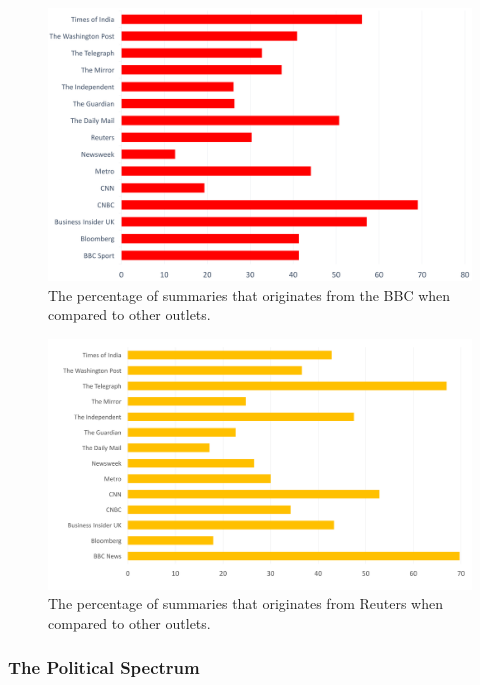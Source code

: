 \documentclass[12pt]{article}
\begin{document}
\begin{figure}[ht!]
  \centering
    \includegraphics[scale=0.15]{bbc-news.png}
   \caption[A graph depicting responses to the User Interface Survey]{The percentage of summaries that originates from the BBC \cite{bbc} when compared to other outlets.}
   \label{bbc-news}
\end{figure} 

\begin{figure}[ht!]
  \centering
    \includegraphics[scale=0.15]{reuters.png}
   \caption[A graph depicting responses to the User Interface Survey]{The percentage of summaries that originates from Reuters  \cite{reuters} when compared to other outlets.}
   \label{reuters}
\end{figure} 

\subsubsection{The Political Spectrum}
\end{document}
